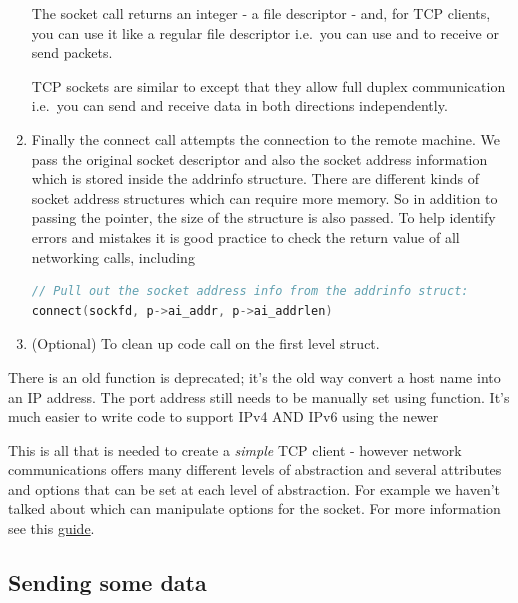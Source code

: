 \begin{enumerate}
The socket call returns an integer - a file descriptor - and, for TCP clients, you can use it like a regular file descriptor i.e.~you can use  and  to receive or send packets.

TCP sockets are similar to  except that they allow full duplex communication i.e.~you can send and receive data in both directions independently.

\item {}

Finally the connect call attempts the connection to the remote machine.
We pass the original socket descriptor and also the socket address information which is stored inside the addrinfo structure.
There are different kinds of socket address structures which can require more memory.
So in addition to passing the pointer, the size of the structure is also passed.
To help identify errors and mistakes it is good practice to check the return value of all networking calls, including 


\begin{lstlisting}[language=C]
// Pull out the socket address info from the addrinfo struct:
connect(sockfd, p->ai_addr, p->ai_addrlen)
\end{lstlisting}

\item (Optional) To clean up code call  on the first level  struct.
\end{enumerate}

There is an old function  is deprecated; it's the old way convert a host name into an IP address.
The port address still needs to be manually set using  function.
It's much easier to write code to support IPv4 AND IPv6 using the newer 

This is all that is needed to create a \textit{simple} TCP client - however network communications offers many different levels of abstraction and several attributes and options that can be set at each level of abstraction.
For example we haven't talked about  which can manipulate options for the socket.
For more information see this \href{http://www.beej.us/guide/bgnet/output/html/multipage/getaddrinfoman.html}{guide}.

\subsection{Sending some data}

